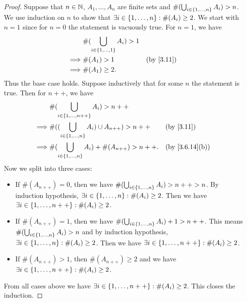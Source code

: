 \begin{proof}
	Suppose that \(n \in \mathbb{N}\), \(A_1, \dots, A_n\) are finite sets and \(\#(\bigcup_{i \in \left\lbrace1, \dots, n\right\rbrace} A_i) > n\).
	We use induction on \(n\) to show that \(\exists i \in \left\lbrace1, \dots, n\right\rbrace : \#(A_i) \geq 2\).
	We start with \(n = 1\) since for \(n = 0\) the statement is vacuously true.
	For \(n = 1\), we have
	\begin{align*}
		         & \#(\bigcup_{i \in \set{1, \dots, 1}} A_i) > 1                \\
		\implies & \#(A_1) > 1                                   &  & \by{3.11} \\
		\implies & \#(A_1) \geq 2.
	\end{align*}
	Thus the base case holds.
	Suppose inductively that for some \(n\) the statement is true.
	Then for \(n++\), we have
	\begin{align*}
		         & \#(\bigcup_{i \in \set{1, \dots, n++}} A_i) > n++                                                \\
		\implies & \#((\bigcup_{i \in \set{1, \dots, n}} A_i) \cup A_{n++}) > n++ &  & \by{3.11}                    \\
		\implies & \#(\bigcup_{i \in \set{1, \dots, n}} A_i) + \#(A_{n++}) > n++. &  & \text{(by \cref{3.6.14}(b))}
	\end{align*}
	Now we split into three cases:
	\begin{itemize}
		\item If \(\#(A_{n++}) = 0\), then we have \(\#(\bigcup_{i \in \left\lbrace1, \dots, n\right\rbrace} A_i) > n++ > n\).
		      By induction hypothesis, \(\exists i \in \left\lbrace1, \dots, n\right\rbrace : \#(A_i) \geq 2\).
		      Then we have \(\exists i \in \left\lbrace1, \dots, n++\right\rbrace : \#(A_i) \geq 2\).
		\item If \(\#(A_{n++}) = 1\), then we have \(\#(\bigcup_{i \in \left\lbrace1, \dots, n\right\rbrace} A_i) + 1 > n++\).
		      This means \(\#(\bigcup_{i \in \left\lbrace1, \dots, n\right\rbrace} A_i) > n\) and by induction hypothesis, \(\exists i \in \left\lbrace1, \dots, n\right\rbrace : \#(A_i) \geq 2\).
		      Then we have \(\exists i \in \left\lbrace1, \dots, n++\right\rbrace : \#(A_i) \geq 2\).
		\item If \(\#(A_{n++}) > 1\), then \(\#(A_{n++}) \geq 2\) and we have \(\exists i \in \left\lbrace1, \dots, n++\right\rbrace : \#(A_i) \geq 2\).
	\end{itemize}
	From all cases above we have \(\exists i \in \left\lbrace1, \dots, n++\right\rbrace : \#(A_i) \geq 2\).
	This closes the induction.
\end{proof}
